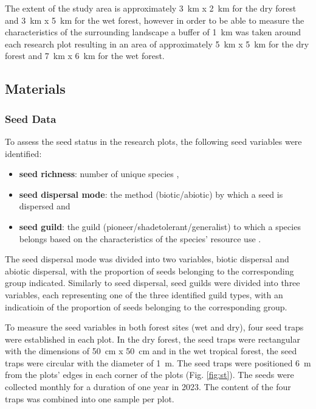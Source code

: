 The extent of the study area is approximately 3~km x 2~km for the dry forest and 3~km x 5~km for the wet forest, however in order to be able to measure the characteristics of the surrounding landscape a buffer of 1~km was taken around each research plot resulting in an area of approximately 5~km x 5~km for the dry forest and 7~km x 6~km for the wet forest.

\subsection{Materials}

\subsubsection{Seed Data}
To assess the seed status in the research plots, the following seed variables were identified:
\begin{itemize}
    \item \textbf{seed richness}: number of unique species \citep{butlerSpeciesRichnessSpatial1998}, 
    \item \textbf{seed dispersal mode}: the method (biotic/abiotic) by which a seed is dispersed \citep{dentUnitingNicheDifferentiation2021} and 
    \item \textbf{seed guild}: the guild (pioneer/shadetolerant/generalist) to which a species belongs based on the characteristics of the species' resource use \citep{blondelGuildsFunctionalGroups2003}. 
\end{itemize}

The seed dispersal mode was divided into two variables, biotic dispersal and abiotic dispersal, with the proportion of seeds belonging to the corresponding group indicated. Similarly to seed dispersal, seed guilds were divided into three variables, each representing one of the three identified guild types, with an indicatioin of the proportion of seeds belonging to the corresponding group.

To measure the seed variables in both forest sites (wet and dry), four seed traps were established in each plot. In the dry forest, the seed traps were rectangular with the dimensions of 50~cm x 50~cm and in the wet tropical forest, the seed traps were circular with the diameter of 1~m. The seed traps were positioned 6~m from the plots’ edges in each corner of the plots (Fig. \ref{fig:st}). The seeds were collected monthly for a duration of one year in 2023. The content of the four traps was combined into one sample per plot.

